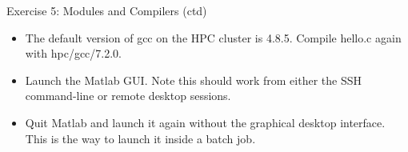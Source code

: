 \documentclass[handout]{beamer} %
\begin{document}
{
%
\begin{frame}{Exercise 5: Modules and Compilers (ctd)}
  \begin{itemize}
  \item{The default version of gcc on the HPC cluster is 4.8.5. Compile hello.c again with \alert{hpc/gcc/7.2.0}.}
\item{Launch the Matlab GUI. Note this should work from either the SSH command-line or remote desktop sessions.}
\item{Quit Matlab and launch it again without the graphical desktop interface. This is the way to launch it inside a batch job.}
\end{itemize}
\end{frame}
}
\end{document}

